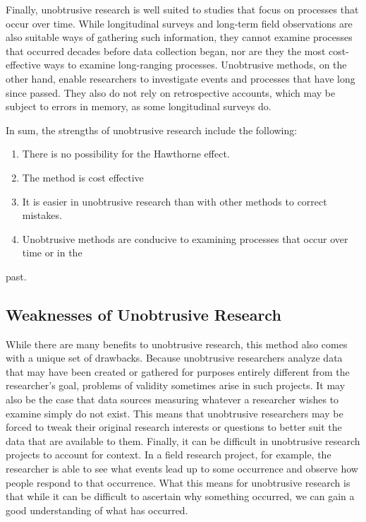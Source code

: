 Finally, unobtrusive research is well suited to studies that focus on processes that occur over time. While longitudinal surveys and long-term field observations are also suitable ways of gathering such information, they cannot examine processes that occurred decades before data collection began, nor are they the most cost-effective ways to examine long-ranging processes. Unobtrusive methods, on the other hand, enable researchers to investigate events and processes that have long since passed. They also do not rely on retrospective accounts, which may be subject to errors in memory, as some longitudinal surveys do.

In sum, the strengths of unobtrusive research include the following:

\begin{enumerate}
	\item There is no possibility for the Hawthorne effect.
	\item The method is cost effective
	\item It is easier in unobtrusive research than with other methods to correct mistakes.
	\item Unobtrusive methods are conducive to examining processes that occur over time or in the 
\end{enumerate}past.

\subsection{Weaknesses of Unobtrusive Research}

While there are many benefits to unobtrusive research, this method also comes with a unique set of drawbacks. Because unobtrusive researchers analyze data that may have been created or gathered for purposes entirely different from the researcher's goal, problems of validity sometimes arise in such projects. It may also be the case that data sources measuring whatever a researcher wishes to examine simply do not exist. This means that unobtrusive researchers may be forced to tweak their original research interests or questions to better suit the data that are available to them. Finally, it can be difficult in unobtrusive research projects to account for context. In a field research project, for example, the researcher is able to see what events lead up to some occurrence and observe how people respond to that occurrence. What this means for unobtrusive research is that while it can be difficult to ascertain why something occurred, we can gain a good understanding of what has occurred.


